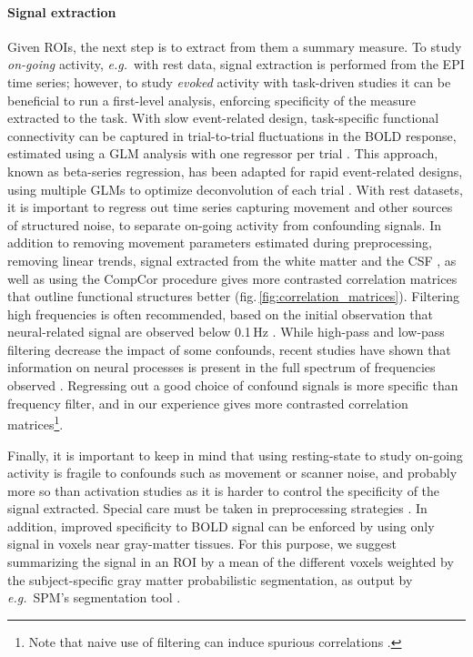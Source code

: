 \documentclass[5p]{elsarticle}
\begin{document}
\paragraph{Signal extraction}
%
Given ROIs, the next step is to extract from them a summary measure. To
study \emph{on-going} activity, \emph{e.g.}\ with rest data, signal
extraction is performed from the EPI time series; however, to study
\emph{evoked} activity with task-driven studies it can be beneficial to
run a first-level analysis, enforcing specificity of the measure
extracted to the task. With slow event-related design, task-specific
functional connectivity can be captured in trial-to-trial fluctuations in
the BOLD response, estimated using a GLM analysis with one regressor per
trial \cite{grillon2012,rissman2004}. This approach, known as beta-series
regression, has been adapted for rapid event-related designs, using
multiple GLMs to optimize deconvolution of each trial \cite{mumford2012}.
With rest datasets, it is important to regress out time series capturing
movement and other sources of structured noise, to separate on-going
activity from confounding signals. In addition to removing movement
parameters estimated during preprocessing, removing linear trends, signal
extracted from the white matter and the CSF \cite{chang2009}, as well as
using the CompCor \cite{behzadi2007} procedure gives more contrasted
correlation matrices that outline functional structures better
(fig.\,\ref{fig:correlation_matrices}). Filtering high frequencies is
often recommended, based on the initial observation that neural-related
signal are observed below 0.1\,Hz \cite{cordes2001,biswal1995}. While
high-pass and low-pass filtering decrease the impact of some confounds,
recent studies have shown that information on neural processes is present
in the full spectrum of frequencies observed
\cite{smith2012,vanoort2012}. Regressing out a good choice of confound
signals is more specific than frequency filter, and in our experience
gives more contrasted correlation matrices\footnote{Note that naive use
of filtering can induce spurious correlations \cite{davey2012}.}.

Finally, it is important to keep in mind that using resting-state to
study on-going activity is fragile to confounds such as movement
\cite{vandijk2012,power2011} or scanner noise, and probably more so than
activation studies as it is harder to control the specificity of the
signal extracted. Special care must be taken in preprocessing strategies
\cite{vandijk2010,satterthwaite2012}.
%
In addition, improved specificity to BOLD signal can be enforced by
using only signal in voxels near gray-matter tissues. For this purpose,
we suggest summarizing the signal in an ROI by a mean of the different voxels
weighted by the subject-specific gray matter probabilistic segmentation,
as output by \emph{e.g.}\ SPM's segmentation tool \cite{ashburner2005}.
\end{document}
